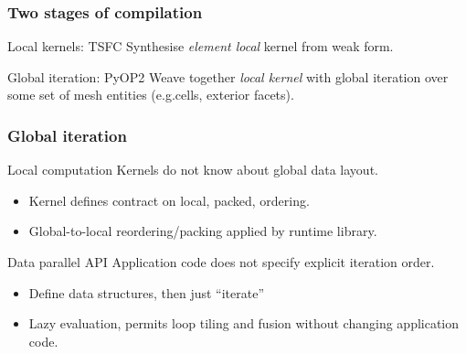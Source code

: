 \documentclass[presentation]{beamer}
\begin{document}
\begin{frame}
  \frametitle{Two stages of compilation}
  \begin{block}{Local kernels: TSFC}
    Synthesise \emph{element local} kernel from weak form.
  \end{block}
  \begin{block}{Global iteration: PyOP2}
    Weave together \emph{local kernel} with global iteration over some
    set of mesh entities (e.g.\@ cells, exterior facets).
  \end{block}
\end{frame}

\begin{frame}
  \frametitle{Global iteration}
  \begin{block}{Local computation}
    Kernels do not know about global data layout.
    \begin{itemize}
    \item Kernel defines contract on local, packed, ordering.
    \item Global-to-local reordering/packing applied by runtime library.
    \end{itemize}
  \end{block}
  \begin{block}{Data parallel API}
    Application code does not specify explicit iteration order.
    \begin{itemize}
    \item Define data structures, then just ``iterate''
    \item Lazy evaluation, permits loop tiling and fusion without
      changing application code.
    \end{itemize}
  \end{block}
\end{frame}
\end{document}
